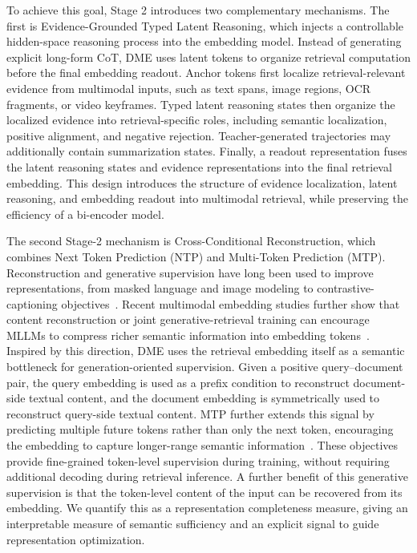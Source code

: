 To achieve this goal, Stage 2 introduces two complementary mechanisms. The first is Evidence-Grounded Typed Latent Reasoning, which injects a controllable hidden-space reasoning process into the embedding model. Instead of generating explicit long-form CoT, DME uses latent tokens to organize retrieval computation before the final embedding readout. Anchor tokens first localize retrieval-relevant evidence from multimodal inputs, such as text spans, image regions, OCR fragments, or video keyframes. Typed latent reasoning states then organize the localized evidence into
retrieval-specific roles, including semantic localization, positive alignment,
and negative rejection. Teacher-generated trajectories may additionally contain
summarization states. Finally, a readout representation fuses the latent reasoning states and evidence representations into the final retrieval embedding. This design introduces the structure of evidence localization, latent reasoning, and embedding readout into multimodal retrieval, while preserving the efficiency of a bi-encoder model.

The second Stage-2 mechanism is Cross-Conditional Reconstruction, which combines Next Token Prediction (NTP) and Multi-Token Prediction (MTP). Reconstruction and generative supervision have long been used to improve representations, from masked language and image modeling to contrastive-captioning objectives~\cite{bert,MAE,CoCa}. Recent multimodal embedding studies further show that content reconstruction or joint generative-retrieval training can encourage MLLMs to compress richer semantic information into embedding tokens~\cite{CoCoA,CREM}. Inspired by this direction, DME uses the retrieval embedding itself as a semantic bottleneck for generation-oriented supervision. Given a positive query--document pair, the query embedding is used as a prefix condition to reconstruct document-side textual content, and the document embedding is symmetrically used to reconstruct query-side textual content. MTP further extends this signal by predicting multiple future tokens rather than only the next token, encouraging the embedding to capture longer-range semantic information~\cite{MultiTokenPrediction,DeepSeekV3}. These objectives provide fine-grained token-level supervision during training, without requiring additional decoding during retrieval inference. A further benefit of this generative supervision is that the token-level content of the input can be recovered from its embedding. We quantify this as a representation completeness measure, giving an interpretable measure of semantic sufficiency and an explicit signal to guide representation optimization.


